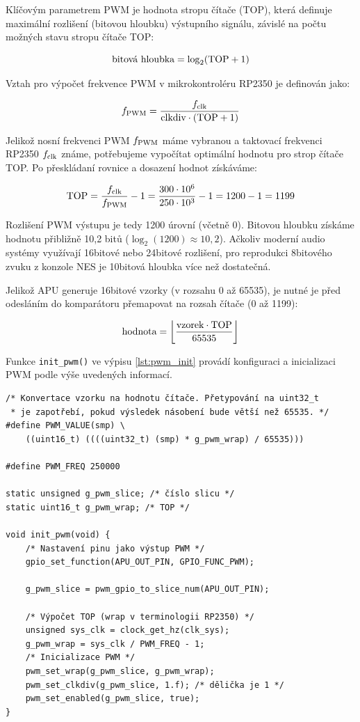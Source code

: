 Klíčovým parametrem PWM je hodnota stropu čítače (TOP), která definuje maximální rozlišení (bitovou
hloubku) výstupního signálu, závislé na počtu možných stavu stropu čítače TOP:

$$
{\text{bitová hloubka}} = \log_2({\text{TOP}} + 1)
$$

Vztah pro výpočet frekvence PWM v mikrokontroléru RP2350 je definován jako:

$$
f_{\text{PWM}} = \frac{f_{\text{clk}}}{{\text{clkdiv}} \cdot ({\text{TOP}} + 1)}
$$

Jelikož nosní frekvenci PWM $f_{\text{PWM}}$ máme vybranou a taktovací frekvenci RP2350
$f_{\text{clk}}$ známe, potřebujeme vypočítat optimální hodnotu pro strop čítače TOP. Po
přeskládaní rovnice a dosazení hodnot získáváme:

$$
{\text{TOP}} = \frac{f_{\text{clk}}}{f_{\text{PWM}}} - 1 = \frac{300 \cdot 10^6}{250 \cdot 10^3} - 1 = 1200 - 1 = 1199
$$

Rozlišení PWM výstupu je tedy 1200 úrovní (včetně 0). Bitovou hloubku získáme hodnotu přibližně 10,2
bitů ($\log_2(1200) \approx 10,2$). Ačkoliv moderní audio systémy využívají 16bitové nebo 24bitové
rozlišení, pro reprodukci 8bitového zvuku z konzole NES je 10bitová hloubka více než dostatečná.

Jelikož APU generuje 16bitové vzorky (v rozsahu 0 až 65535), je nutné je před odesláním do
komparátoru přemapovat na rozsah čítače (0 až 1199):

$$
{\text{hodnota}} = \left\lfloor{\frac{{\text{vzorek}} \cdot {\text{TOP}}}{65535}}\right\rfloor
$$

Funkce \texttt{init\_pwm()} ve výpisu \ref{lst:pwm_init} provádí konfiguraci a inicializaci PWM
podle výše uvedených informací.

\begin{listing}[htbp]
\begin{verbatim}
/* Konvertace vzorku na hodnotu čítače. Přetypování na uint32_t
 * je zapotřebí, pokud výsledek násobení bude větší než 65535. */
#define PWM_VALUE(smp) \
    ((uint16_t) ((((uint32_t) (smp) * g_pwm_wrap) / 65535)))

#define PWM_FREQ 250000

static unsigned g_pwm_slice; /* číslo slicu */
static uint16_t g_pwm_wrap; /* TOP */

void init_pwm(void) {
    /* Nastavení pinu jako výstup PWM */
    gpio_set_function(APU_OUT_PIN, GPIO_FUNC_PWM);

    g_pwm_slice = pwm_gpio_to_slice_num(APU_OUT_PIN);

    /* Výpočet TOP (wrap v terminologii RP2350) */
    unsigned sys_clk = clock_get_hz(clk_sys);
    g_pwm_wrap = sys_clk / PWM_FREQ - 1;
    /* Inicializace PWM */
    pwm_set_wrap(g_pwm_slice, g_pwm_wrap);
    pwm_set_clkdiv(g_pwm_slice, 1.f); /* dělička je 1 */
    pwm_set_enabled(g_pwm_slice, true);
}
\end{verbatim}
\caption{Inicializace a konfigurace PWM.}
\label{lst:pwm_init}
\end{listing}

